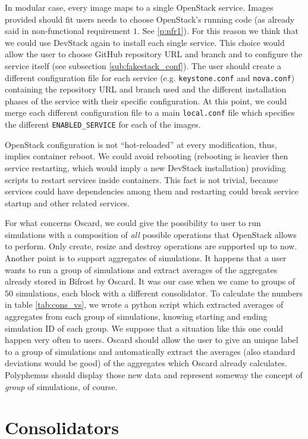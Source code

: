 In modular case, every image maps to a single OpenStack service. Images provided should fit users needs to choose OpenStack's running code (as already said in non-functional requirement $1$. See \ref{p:nfr1}). For this reason we think that we could use DevStack again to install each single service. This choice would allow the user to choose GitHub repository URL and branch and to configure the service itself (see subsection \ref{sub:fakestack_conf}). The user should create a different configuration file for each service (e.g. \texttt{keystone.conf} and \texttt{nova.conf}) containing the repository URL and branch used and the different installation phases of the service with their specific configuration. At this point, we could merge each different configuration file to a main \texttt{local.conf} file which specifies the different \texttt{ENABLED\_SERVICE} for each of the images.

OpenStack configuration is not ``hot-reloaded'' at every modification, thus, implies container reboot. We could avoid rebooting (rebooting is heavier then service restarting, which would imply a new DevStack installation) providing scripts to restart services inside containers. This fact is not trivial, because services could have dependencies among them and restarting could break service startup and other related services. 

For what concerns Oscard, we could give the possibility to user to run simulations with a composition of \emph{all} possible operations that OpenStack allows to perform. Only create, resize and destroy operations are supported up to now. Another point is to support aggregates of simulations. It happens that a user wants to run a group of simulations and extract averages of the aggregates already stored in Bifrost by Oscard. It was our case when we came to groups of $50$ simulations, each block with a different consolidator. To calculate the numbers in table \ref{tab:cons_vs}, we wrote a python script which extracted averages of aggregates from each group of simulations, knowing starting and ending simulation ID of each group. We suppose that a situation like this one could happen very often to users. Oscard should allow the user to give an unique label to a group of simulations and automatically extract the averages (also standard deviations would be good) of the aggregates which Oscard already calculates. Polyphemus should display those new data and represent someway the concept of \emph{group} of simulations, of course.

\section{Consolidators}
\label{sec:conc_cons}